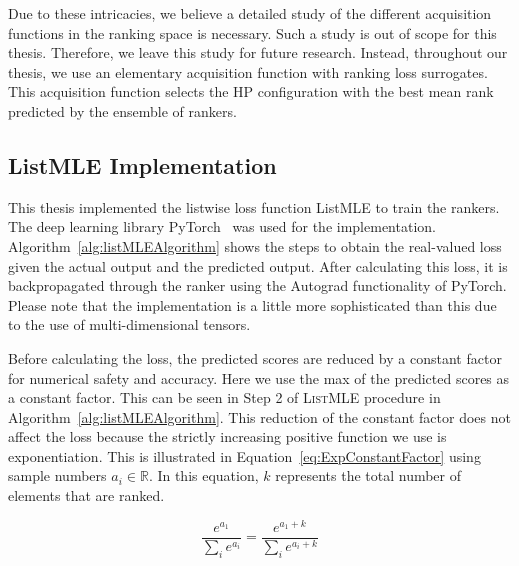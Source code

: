 \documentclass[12pt, twoside, ngerman]{report}
\begin{document}
Due to these intricacies, we believe a detailed study of the different acquisition functions in the ranking space is necessary. Such a study is out of scope for this thesis. Therefore, we leave this study for future research.
Instead, throughout our thesis, we use an elementary acquisition function with ranking loss surrogates. This acquisition function selects the HP configuration with the best mean rank predicted by the ensemble of rankers.

\subsection{ListMLE Implementation}

This thesis implemented the listwise loss function ListMLE to train the rankers. The deep learning library PyTorch~\cite{PyTorch} was used for the implementation.
Algorithm~\ref{alg:listMLEAlgorithm} shows the steps to obtain the real-valued loss given the actual output and the predicted output.
After calculating this loss, it is backpropagated through the ranker using the Autograd functionality of PyTorch.
Please note that the implementation is a little more sophisticated than this due to the use of multi-dimensional tensors.

Before calculating the loss, the predicted scores are reduced by a constant factor for numerical safety and accuracy. Here we use the max of the predicted scores as a constant factor. This can be seen in Step 2 of \textsc{ListMLE} procedure in Algorithm~\ref{alg:listMLEAlgorithm}.
This reduction of the constant factor does not affect the loss because the strictly increasing positive function we use is exponentiation. This is illustrated in Equation~\ref{eq:ExpConstantFactor} using sample numbers $a_i \in  \mathbb{R}$.
In this equation, $k$ represents the total number of elements that are ranked.

\begin{equation}
\label{eq:ExpConstantFactor}
\frac{e^{a_1}}{\sum\limits_{i} e^{a_i}} = \frac{e^{a_1 + k}}{\sum\limits_{i} e^{a_i + k}} 
\end{equation}
\end{document}
